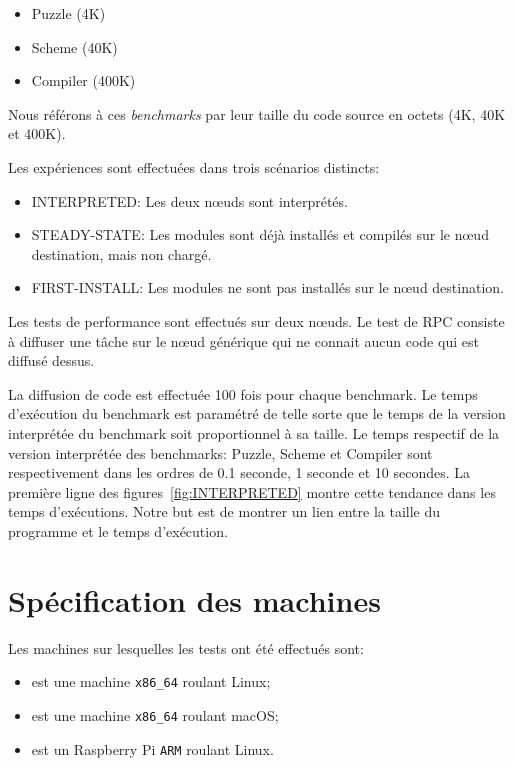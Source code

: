 \begin{itemize}
  \item Puzzle (4K)
  \item Scheme (40K)
  \item Compiler (400K)
\end{itemize}

Nous référons à ces \textit{benchmarks} par leur taille du code source
en octets (4K, 40K et 400K).

Les expériences sont effectuées dans trois scénarios distincts:
\begin{itemize}
  \item INTERPRETED: Les deux nœuds sont interprétés.
  \item STEADY-STATE: Les modules sont déjà installés et compilés sur
    le nœud destination, mais non chargé.
  \item FIRST-INSTALL: Les modules ne sont pas installés sur le nœud
    destination.
\end{itemize}

Les tests de performance sont effectués sur deux nœuds.  Le test de RPC
consiste à diffuser une tâche sur le nœud générique qui ne connait
aucun code qui est diffusé dessus.

La diffusion de code est effectuée 100 fois pour chaque benchmark. Le temps
d'exécution du benchmark est paramétré de telle sorte que le temps de la
version interprétée du benchmark soit proportionnel à sa taille. Le temps
respectif de la version interprétée des benchmarks: Puzzle, Scheme et Compiler
sont respectivement dans les ordres de 0.1 seconde, 1 seconde et 10 secondes.
La première ligne des figures~\ref{fig:INTERPRETED} montre cette tendance
dans les temps d'exécutions. Notre but est de montrer un lien entre la taille
du programme et le temps d'exécution.

\section{Spécification des machines}
Les machines sur lesquelles les tests ont été effectués sont:
\begin{itemize}
  \item \MMM[x86/Linux] est une machine \texttt{x86\_64} roulant Linux;
  \item \MMM[x86/macOS] est une machine \texttt{x86\_64} roulant macOS;
  \item {} est un Raspberry Pi \texttt{ARM} roulant Linux.
\end{itemize}

